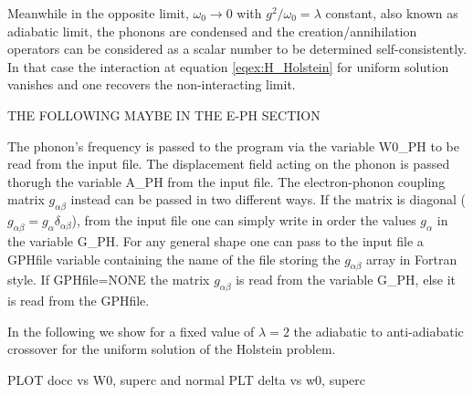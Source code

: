 \documentclass[edipack2.tex]{subfiles}
\begin{document}
Meanwhile in the opposite limit, $\omega_0 \rightarrow 0$ with $g^2/\omega_0=\lambda$ constant, also known as adiabatic limit, the phonons are condensed and the creation/annihilation operators can be considered as a scalar number to be determined self-consistently. In that case the interaction at equation \eqref{eqex:H_Holstein} for uniform solution vanishes and one recovers the non-interacting limit.

THE FOLLOWING MAYBE IN THE E-PH SECTION

The phonon's frequency is passed to the \NAME program via the variable W0\_PH to be read from the input file. The displacement field acting on the phonon is passed thorugh the variable A\_PH from the input file. The electron-phonon coupling matrix $g_{\alpha \beta}$ instead can be passed in two different ways. If the matrix is diagonal ($g_{\alpha \beta} = g_\alpha \delta_{\alpha \beta}$), from the input file one can simply write in order the values $g_\alpha$ in the variable G\_PH. For any general shape one can pass to the input file a GPHfile variable containing the name of the file storing the $g_{\alpha \beta}$ array in Fortran style.
If GPHfile=NONE the matrix $g_{\alpha \beta}$ is read from the variable G\_PH, else it is read from the GPHfile.

In the following we show for a fixed value of $\lambda=2$ the adiabatic to anti-adiabatic crossover for the uniform solution of the Holstein problem.

PLOT docc vs W0, superc and normal
PLT delta vs w0, superc
\end{document}
